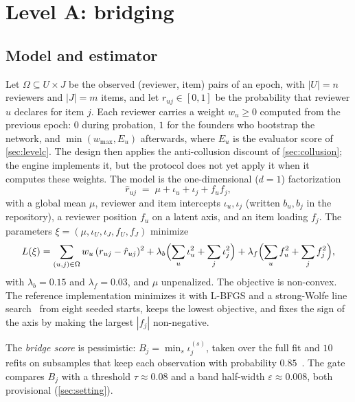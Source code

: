 \section{Level A: bridging}\label{sec:levela}

\subsection{Model and estimator}

Let $\Omega\subseteq U\times J$ be the observed (reviewer, item) pairs of an epoch, with
$|U|=n$ reviewers and $|J|=m$ items, and let $r_{uj}\in[0,1]$ be the probability that
reviewer $u$ declares for item $j$. Each reviewer carries a weight $w_u\ge0$ computed from
the previous epoch: $0$ during probation, $1$ for the founders who bootstrap the network, and
$\min(w_{\max},E_u)$ afterwards, where $E_u$ is the evaluator score of \cref{sec:levelc}. The design then applies the anti-collusion discount of
\cref{sec:collusion}; the engine implements it, but the protocol does not yet apply it when it
computes these weights. The model is the
one-dimensional ($d=1$) factorization
\begin{equation}\label{eq:mf}
  \hat r_{uj} \;=\; \mu + \iota_u + \iota_j + f_u f_j ,
\end{equation}
with a global mean $\mu$, reviewer and item intercepts $\iota_u,\iota_j$ (written
$b_u,b_j$ in the repository), a reviewer position $f_u$ on a latent axis, and an item loading
$f_j$. The parameters $\xi=(\mu,\iota_U,\iota_J,f_U,f_J)$ minimize
\begin{equation}\label{eq:loss}
  L(\xi) = \sum_{(u,j)\in\Omega} w_u\,(r_{uj}-\hat r_{uj})^2
  + \lambda_b\Bigl(\sum_u \iota_u^2+\sum_j\iota_j^2\Bigr)
  + \lambda_f\Bigl(\sum_u f_u^2+\sum_j f_j^2\Bigr),
\end{equation}
with $\lambda_b=0.15$ and $\lambda_f=0.03$, and $\mu$ unpenalized. The objective is
non-convex. The reference implementation minimizes it with L-BFGS and a strong-Wolfe line
search~\cite{liu1989lbfgs,nocedal2006numerical} from eight seeded starts, keeps the lowest
objective, and fixes the sign of the axis by making the largest $|f_j|$ non-negative.

The \emph{bridge score} is pessimistic: $B_j=\min_s \iota_j^{(s)}$, taken over the full fit and
$10$ refits on subsamples that keep each observation with probability $0.85$~\cite{efron1993bootstrap}.
The gate compares $B_j$ with a threshold $\tau\approx0.08$ and a band half-width
$\varepsilon\approx0.008$, both provisional (\cref{sec:setting}).

